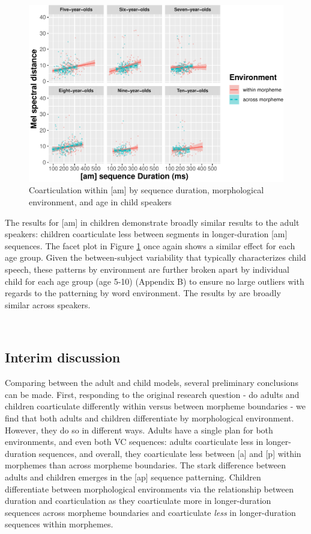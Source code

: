 \documentclass[
]{article}
\begin{document}
\begin{figure}
\centering
\includegraphics{3_ch3_results_files/figure-latex/child-facet-am-1.pdf}
\caption{\label{fig:child-facet-am}Coarticulation within {[}am{]} by sequence duration, morphological environment, and age in child speakers}
\end{figure}

The results for {[}am{]} in children demonstrate broadly similar results to the adult speakers: children coarticulate less between segments in longer-duration {[}am{]} sequences. The facet plot in Figure \ref{fig:child-facet-am} once again shows a similar effect for each age group. Given the between-subject variability that typically characterizes child speech, these patterns by environment are further broken apart by individual child for each age group (age 5-10) (Appendix B) to ensure no large outliers with regards to the patterning by word environment. The results by are broadly similar across speakers.

~
~

\hypertarget{interim-discussion}{%
\subsection{Interim discussion}\label{interim-discussion}}

Comparing between the adult and child models, several preliminary conclusions can be made. First, responding to the original research question - do adults and children coarticulate differently within versus between morpheme boundaries - we find that both adults and children differentiate by morphological environment. However, they do so in different ways. Adults have a single plan for both environments, and even both VC sequences: adults coarticulate less in longer-duration sequences, and overall, they coarticulate less between {[}a{]} and {[}p{]} within morphemes than across morpheme boundaries. The stark difference between adults and children emerges in the {[}ap{]} sequence patterning. Children differentiate between morphological environments via the relationship between duration and coarticulation as they coarticulate more in longer-duration sequences across morpheme boundaries and coarticulate \emph{less} in longer-duration sequences within morphemes.
\end{document}

